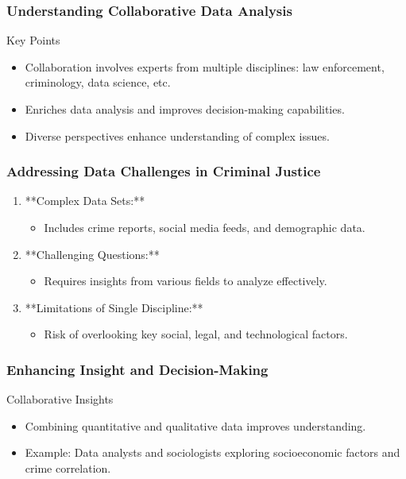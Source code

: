 \documentclass[aspectratio=169]{beamer}
\begin{document}
\begin{frame}[fragile]
    \frametitle{Understanding Collaborative Data Analysis}
    \begin{block}{Key Points}
        \begin{itemize}
            \item Collaboration involves experts from multiple disciplines: law enforcement, criminology, data science, etc.
            \item Enriches data analysis and improves decision-making capabilities.
            \item Diverse perspectives enhance understanding of complex issues.
        \end{itemize}
    \end{block}
\end{frame}

\begin{frame}[fragile]
    \frametitle{Addressing Data Challenges in Criminal Justice}
    \begin{enumerate}
        \item **Complex Data Sets:**
            \begin{itemize}
                \item Includes crime reports, social media feeds, and demographic data.
            \end{itemize}
        \item **Challenging Questions:**
            \begin{itemize}
                \item Requires insights from various fields to analyze effectively.
            \end{itemize}
        \item **Limitations of Single Discipline:**
            \begin{itemize}
                \item Risk of overlooking key social, legal, and technological factors.
            \end{itemize}
    \end{enumerate}
\end{frame}

\begin{frame}[fragile]
    \frametitle{Enhancing Insight and Decision-Making}
    \begin{block}{Collaborative Insights}
        \begin{itemize}
            \item Combining quantitative and qualitative data improves understanding.
            \item Example: Data analysts and sociologists exploring socioeconomic factors and crime correlation.
        \end{itemize}
    \end{block}
\end{frame}
\end{document}
